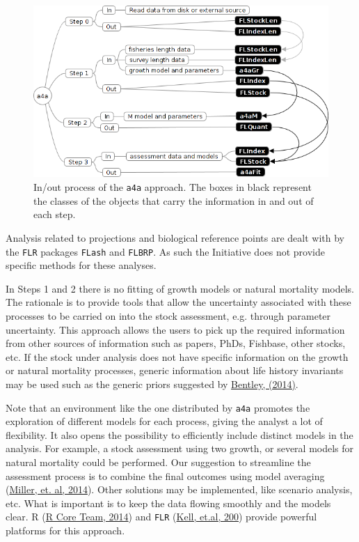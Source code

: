 \documentclass[a4paper,english,10pt]{article}\usepackage[]{graphicx}\usepackage[]{color}
\newcommand{\initiative}[1]{{\texttt{#1}}}
\newcommand{\pkg}[1]{{\texttt{#1}}}
\begin{document}
\begin{figure}[H]
\centering
\includegraphics[width=\textwidth]{./inout}
\caption{In/out process of the \initiative{a4a} approach. The boxes in black represent the classes of the objects that carry the information in and out of each step.}
\label{fig:inout}
\end{figure}

Analysis related to projections and biological reference points are dealt with by the \pkg{FLR} packages \pkg{FLash} and \pkg{FLBRP}. As such the Initiative does not provide specific methods for these analyses.

In Steps 1 and 2 there is no fitting of growth models or natural mortality models. The rationale is to provide tools that allow the uncertainty associated with these processes to be carried on into the stock assessment, e.g. through parameter uncertainty. This approach allows the users to pick up the required information from other sources of information such as papers, PhDs, Fishbase, other stocks, etc. If the stock under analysis does not have specific information on the growth or natural mortality processes, generic information about life history invariants may be used such as the generic priors suggested by \href{http://icesjms.oxfordjournals.org/content/early/2014/03/04/icesjms.fsu023.abstract}{Bentley, (2014)}.

Note that an environment like the one distributed by \initiative{a4a} promotes the exploration of different models for each process, giving the analyst a lot of flexibility. It also opens the possibility to efficiently include distinct models in the analysis. For example, a stock assessment using two growth, or several models for natural mortality could be performed. Our suggestion to streamline the assessment process is to combine the final outcomes using model averaging (\href{http://icesjms.oxfordjournals.org/content/early/2014/03/31/icesjms.fsu043.abstract}{Miller, et. al, 2014}). Other solutions may be implemented, like scenario analysis, etc. What is important is to keep the data flowing smoothly and the models clear. R (\href{http://www.R-project.org/}{R Core Team, 2014}) and \pkg{FLR} (\href{http://icesjms.oxfordjournals.org/content/64/4/640.abstract}{Kell, et.al, 200}) provide powerful platforms for this approach.
\end{document}
